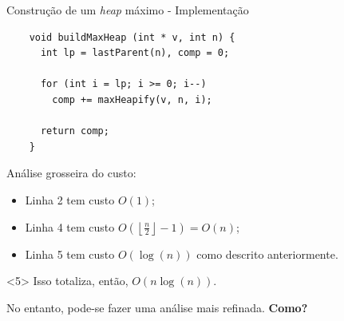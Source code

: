 \documentclass[t, 10pt]{beamer}
\begin{document}
  \begin{frame}[fragile]{Construção de um \emph{heap} máximo - Implementação}
    \begin{center}
    \begin{minipage}{0.52\textwidth}
    \begin{verbatim}
    void buildMaxHeap (int * v, int n) {
      int lp = lastParent(n), comp = 0;
      
      for (int i = lp; i >= 0; i--)
        comp += maxHeapify(v, n, i);
        
      return comp;
    }
    \end{verbatim}
    \end{minipage}
    \end{center}
    
    
    \pause
    Análise grosseira do custo:
    
    \begin{itemize}
      \item<2-> Linha 2 tem custo $O(1)$;
      \item<3-> Linha 4 tem custo $O\left(\left\lfloor\frac{n}{2}\right\rfloor - 1\right) = O(n)$;
      \item<4-> Linha 5 tem custo $O(\log(n))$ como descrito anteriormente.
    \end{itemize}

    \begin{onlyenv}<5>
      Isso totaliza, então, $O(n\log(n))$.
      
      No entanto, pode-se fazer uma análise mais refinada. \textbf{Como?}
    \end{onlyenv}
  \end{frame}
\end{document}
